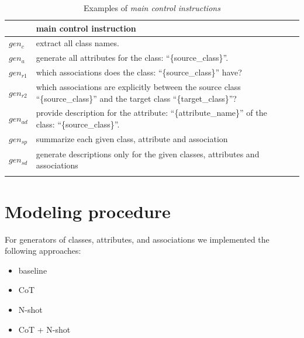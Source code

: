 \begin{table}[!h]
    \scriptsize
    \centering
    \setlength{\tabcolsep}{0.5em}
\begin{tabular}{@{}l>{\raggedright\arraybackslash}p{}>{\raggedright\arraybackslash}p{}@{}}
         & main control instruction \\
    \toprule
    \addlinespace
    
$gen_c$ & extract all class names. \\
\addlinespace

$gen_a$ & generate all attributes for the class: ``\{source\_class\}''. \\
\addlinespace

$gen_{r1}$ & which associations does the class: ``\{source\_class\}'' have? \\
\addlinespace

$gen_{r2}$ & which associations are explicitly between the source class ``\{source\_class\}'' and the target class ``\{target\_class\}''? \\
\addlinespace

$gen_{ad}$ & provide description for the attribute: ``\{attribute\_name\}'' of the class: ``\{source\_class\}''. \\
\addlinespace

$gen_{sp}$ & summarize each given class, attribute and association \\
\addlinespace

$gen_{sd}$ & generate descriptions only for the given classes, attributes and associations \\
\addlinespace

	\bottomrule
	\addlinespace
	\end{tabular}
	\caption{Examples of \emph{main control instructions}}
	\label{tab:main-control-instructions}
\end{table}


\section{Modeling procedure}

For generators of classes, attributes, and associations we implemented the following approaches:

\begin{itemize}
\item baseline
\item CoT
\item N-shot
\item CoT + N-shot
\end{itemize}

